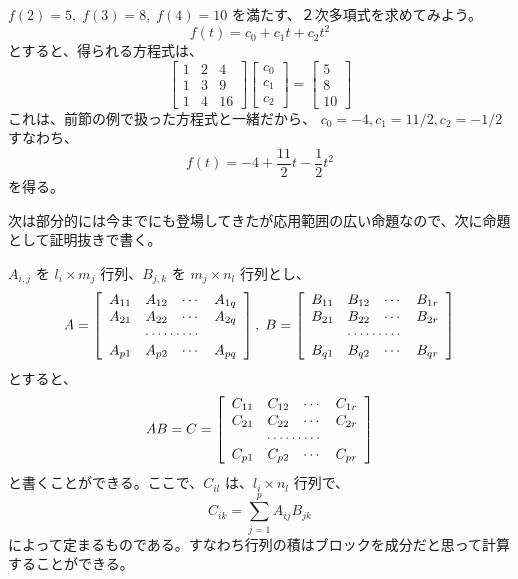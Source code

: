 \begin{eg}
$f(2) = 5, \;f(3) = 8,\;f(4) = 10$ を満たす、２次多項式を求めてみよう。
$$f(t) = c_0 + c_1t + c_2t^2$$
とすると、得られる方程式は、
$$\left[\begin{array}{ccc}1 & 2 & 4\\ 1 & 3 & 9\\ 1 & 4 & 16 \end{array}\right]
\left[\begin{array}{c}c_0 \\c_1 \\ c_2\end{array}\right] = 
\left[\begin{array}{c}5 \\8 \\ 10\end{array}\right]$$
これは、前節の例で扱った方程式と一緒だから、
$c_0 = -4, c_1 = 11/2, c_2 = -1/2$ すなわち、
$$f(t) = -4 + \frac{11}{2}t - \frac12t^2$$
を得る。
\end{eg}

次は部分的には今までにも登場してきたが応用範囲の広い命題なので、次に命題として証明抜きで書く。

\begin{prop}
$A_{i,j}$ を $l_i\times m_j$ 行列、$B_{j,k}$ を $m_j\times n_l$ 行列とし、
$$A = \left[\begin{array}{cccc}A_{11} & A_{12} & \cdots & A_{1q}\\
A_{21} & A_{22} & \cdots & A_{2q}\\
\multicolumn{4}{c}{\cdots\cdots\cdots}\\
A_{p1} & A_{p2} & \cdots & A_{pq}\end{array}\right],\;
B = \left[\begin{array}{cccc}B_{11} & B_{12} & \cdots & B_{1r}\\
B_{21} & B_{22} & \cdots & B_{2r}\\
\multicolumn{4}{c}{\cdots\cdots\cdots}\\
B_{q1} & B_{q2} & \cdots & B_{qr}\end{array}\right]$$
とすると、
$$AB = C = \left[\begin{array}{cccc}C_{11} & C_{12} & \cdots & C_{1r}\\
C_{21} & C_{22} & \cdots & C_{2r}\\
\multicolumn{4}{c}{\cdots\cdots\cdots}\\
C_{p1} & C_{p2} & \cdots & C_{pr}\end{array}\right]$$
と書くことができる。ここで、$C_{il}$ は、$l_i\times n_l$ 行列で、
$$C_{ik} = \sum_{j = 1}^p A_{ij}B_{jk}$$
によって定まるものである。すなわち行列の積はブロックを成分だと思って計算することができる。
\end{prop}

